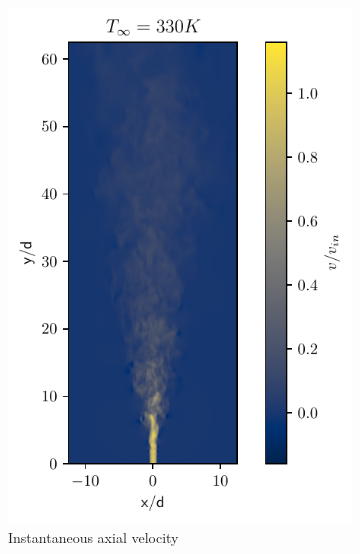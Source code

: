 \begin{figure}[htbp!]
\begin{subfigure}{0.25\textwidth}
	\centering
	\includegraphics[scale=.65]{figures/Plots/vertical/330/v_scaled_vert_330.pdf}
	\caption{Instantaneous axial velocity} \label{330_v_1}
\end{subfigure}
\hfill
\begin{subfigure}{0.25\textwidth}
	\centering

\end{subfigure}
\end{figure}
